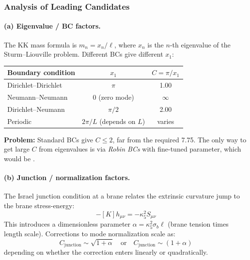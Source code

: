 \subsubsection{Analysis of Leading Candidates}
\label{sec:ch11_factor8_analysis}

\paragraph{(a) Eigenvalue / BC factors.}

The KK mass formula is $m_n = x_n / \ell$, where $x_n$ is the $n$-th eigenvalue
of the Sturm--Liouville problem. Different BCs give different $x_1$:

\begin{center}
\begin{tabular}{lcc}
\toprule
\textbf{Boundary condition} & \textbf{$x_1$} & \textbf{$C = \pi / x_1$} \\
\midrule
Dirichlet--Dirichlet & $\pi$ & 1.00 \\
Neumann--Neumann & $0$ (zero mode) & $\infty$ \\
Dirichlet--Neumann & $\pi/2$ & 2.00 \\
Periodic & $2\pi/L$ (depends on $L$) & varies \\
\bottomrule
\end{tabular}
\end{center}

\textbf{Problem:} Standard BCs give $C \leq 2$, far from the required 7.75.
The only way to get large $C$ from eigenvalues is via \emph{Robin BCs} with
fine-tuned parameter, which would be \tagP{}.

\paragraph{(b) Junction / normalization factors.}

The Israel junction condition at a brane relates the extrinsic curvature jump
to the brane stress-energy:
\begin{equation}
    [K_{\mu\nu}] - [K] h_{\mu\nu} = -\kappa_5^2 S_{\mu\nu}
    \label{eq:ch11_israel}
\end{equation}
This introduces a dimensionless parameter $\alpha = \kappa_5^2 \sigma_b \ell$
(brane tension times length scale). Corrections to mode normalization scale as:
\begin{equation}
    C_{\text{junction}} \sim \sqrt{1 + \alpha}
    \quad\text{or}\quad
    C_{\text{junction}} \sim (1 + \alpha)
    \label{eq:ch11_junction_factor}
\end{equation}
depending on whether the correction enters linearly or quadratically.

